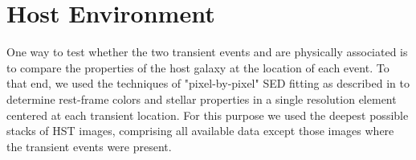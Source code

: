 \section{Host Environment}
\label{sec:Host}
One way to test whether the two transient events \spockone and \spocktwo are physically associated is to compare the properties of the \spock host galaxy at the location of each event.   To that end, we used the techniques of "pixel-by-pixel" SED fitting as described in \citet{Hemmati:2014} to determine rest-frame colors and stellar properties in a single resolution element centered at each transient location.  For this purpose we used the deepest possible stacks of HST images, comprising all available data except those images where the transient events were present. 